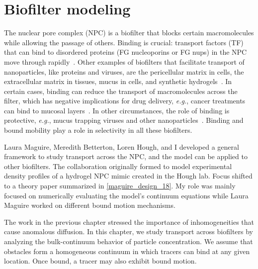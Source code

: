\chapter{Biofilter modeling}\label{ch03_bio}

The nuclear pore complex (NPC) is a biofilter that blocks certain macromolecules
while allowing the passage of others. Binding is crucial: transport factors (TF)
that can bind to disordered proteins (FG nucleoporins or FG nups) in the NPC
move through rapidly~\cite{strambio-de-castillia_nuclear_10}.  Other examples of
biofilters that facilitate transport of nanoparticles, like proteins and
viruses, are the pericellular matrix in cells, the extracellular matrix in
tissues, mucus in cells, and synthetic hydrogels~\cite{witten_particle_17}.  In
certain cases, binding can reduce the transport of macromolecules across the
filter, which has negative implications for drug delivery, \textit{e.g.}, cancer
treatments can bind to mucosal layers~\cite{witten_particle_17}. In other
circumstances, the role of binding is protective, \textit{e.g.}, mucus trapping
viruses and other nanoparticles~\cite{schneider_fluorescent_17,
  huang_protein_17, mastorakos_highly_15}. Binding and bound mobility play a
role in selectivity in all these biofilters.

Laura Maguire, Meredith Betterton, Loren Hough, and I developed a general
framework to study transport across the NPC, and the model can be applied to
other biofilters.  The collaboration originally formed to model experimental
density profiles of a hydrogel NPC mimic created in the Hough lab. Focus shifted
to a theory paper summarized in \cref{maguire_design_18}.  My role was mainly
focused on numerically evaluating the model's continuum equations while Laura
Maguire worked on different bound motion mechanisms.

The work in the previous chapter stressed the importance of inhomogeneities that
cause anomalous diffusion.  In this chapter, we study transport across
biofilters by analyzing the bulk-continuum behavior of particle concentration.
We assume that obstacles form a homogeneous continuum in which tracers can bind
at any given location.  Once bound, a tracer may also exhibit bound motion. 

